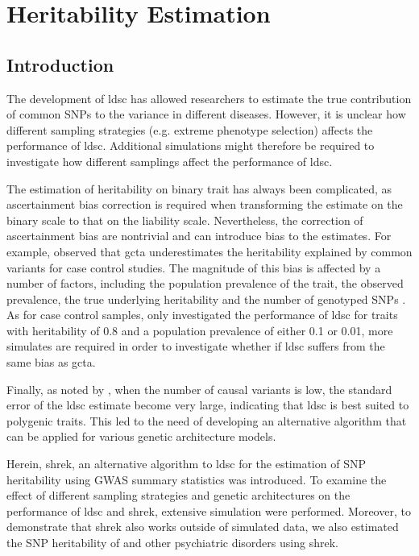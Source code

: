 \chapter{Heritability Estimation}
\label{heritabilityChapter}
	\section{Introduction}
	The development of \gls{ldsc} \citep{Bulik-Sullivan2015} has allowed researchers to estimate the true contribution of common \glspl{SNP} to the variance in different diseases.	
	However, it is unclear how different sampling strategies (e.g. extreme phenotype selection) affects the performance of \gls{ldsc}.
	Additional simulations might therefore be required to investigate how different samplings affect the performance of \gls{ldsc}.
	
	The estimation of heritability on binary trait has always been complicated, as ascertainment bias correction is required when transforming the estimate on the binary scale to that on the liability scale.
	Nevertheless, the correction of ascertainment bias are nontrivial and can introduce bias to the estimates. 
	For example, \citet{Golan2014} observed that \gls{gcta} underestimates the heritability explained by common variants for case control studies.
	The magnitude of this bias is affected by a number of factors, including the population prevalence of the trait, the observed prevalence, the true underlying heritability and the number of genotyped \glspl{SNP} \citep{Golan2014}.
	As for case control samples, \citet{Bulik-Sullivan2015} only investigated the performance of \gls{ldsc} for traits with heritability of 0.8 and a population prevalence of either 0.1 or 0.01, more simulates are required in order to investigate whether if \gls{ldsc} suffers from the same bias as \gls{gcta}.
	
	Finally, as noted by \citet{Bulik-Sullivan2015}, when the number of causal variants is low, the standard error of the \gls{ldsc} estimate become very large, indicating that \gls{ldsc} is best suited to polygenic traits.
	This led to the need of developing an alternative algorithm that can be applied for various genetic architecture models.
	
	Herein, \gls{shrek}, an alternative algorithm to \gls{ldsc} for the estimation of \gls{SNP} heritability using \gls{GWAS} summary statistics was introduced.
	To examine the effect of different sampling strategies and genetic architectures on the performance of \gls{ldsc} and \gls{shrek}, extensive simulation were performed. 
	Moreover, to demonstrate that \gls{shrek} also works outside of simulated data, we also estimated the \gls{SNP} heritability of  and other psychiatric disorders using \gls{shrek}.
	
